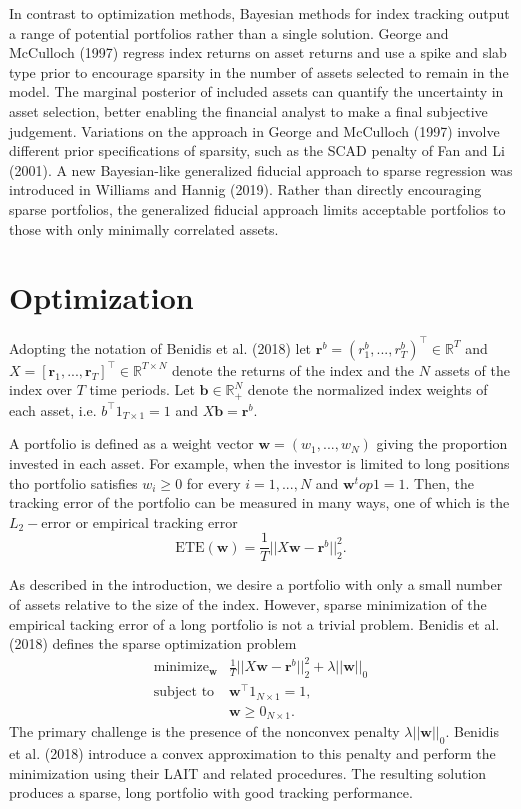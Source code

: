 \documentclass[a4paper, 12pt]{article}
\theoremstyle{plain}
\theoremstyle{definition}
\theoremstyle{remark}
\begin{document}
In contrast to optimization methods, Bayesian methods for index tracking output a range of potential portfolios rather than a single solution.  George and McCulloch (1997) regress index returns on asset returns and use a spike and slab type prior to encourage sparsity in the number of assets selected to remain in the model.  The marginal posterior of included assets can quantify the uncertainty in asset selection, better enabling the financial analyst to make a final subjective judgement.  Variations on the approach in George and McCulloch (1997) involve different prior specifications of sparsity, such as the SCAD penalty of Fan and Li (2001).  A new Bayesian-like generalized fiducial approach to sparse regression was introduced in Williams and Hannig (2019).  Rather than directly encouraging sparse portfolios, the generalized fiducial approach limits acceptable portfolios to those with only minimally correlated assets.  
       

\section*{Optimization}

Adopting the notation of Benidis et al. (2018) let $\textbf{r}^b = (r_1^b,...,r_T^b)^\top \in \mathbb{R}^T$ and $X = [\textbf{r}_1,...,\textbf{r}_T]^\top \in \mathbb{R}^{T\times N}$ denote the returns of the index and the $N$ assets of the index over $T$ time periods.  Let $\textbf{b}\in\mathbb{R}_+^N$ denote the normalized index weights of each asset, i.e. $b^\top 1_{T\times 1} = 1$ and $X\textbf{b} = \textbf{r}^b$.  

A portfolio is defined as a weight vector $\textbf{w} = (w_1, ..., w_N)$ giving the proportion invested in each asset.  For example, when the investor is limited to long positions tho portfolio satisfies $w_i \geq 0$ for every $i = 1, ..., N$ and $\textbf{w}^top 1 = 1$.  Then, the tracking error of the portfolio can be measured in many ways, one of which is the $L_2-$error or empirical tracking error
\[\text{ETE}(\textbf{w})=\frac{1}{T}||X\textbf{w}-\textbf{r}^b||_2^2.\]

As described in the introduction, we desire a portfolio with only a small number of assets relative to the size of the index.  However, sparse minimization of the empirical tacking error of a long portfolio is not a trivial problem. Benidis et al. (2018) defines the sparse optimization problem
\begin{align}
\text{minimize}_{\textbf{w}}& \frac{1}{T}||X\textbf{w}-\textbf{r}^b||_2^2 + \lambda||\textbf{w}||_0\nonumber\\
\text{subject to}& \textbf{w}^\top 1_{N\times 1}=1, \nonumber \\
 & \textbf{w}\geq 0_{N\times 1}.
\end{align}  
The primary challenge is the presence of the nonconvex penalty $\lambda||\textbf{w}||_0$.  Benidis et al. (2018) introduce a convex approximation to this penalty and perform the minimization using their LAIT and related procedures.  The resulting solution produces a sparse, long portfolio with good tracking performance.
\end{document}
